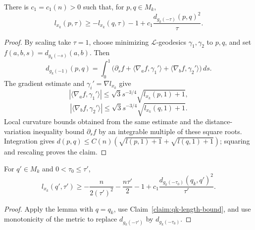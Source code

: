 \begin{lemma}\label{lem:l-function-lower-bound}
\label{lowerbdd}
There is $c_1=c_1(n)>0$ such that, for $p,q\in M_k$,
\[
 l_{x_k}(p,\tau)\geq-l_{x_k}(q,\tau)-1
 +c_1\frac{d_{g_k(-\tau)}(p,q)^2}{\tau}.
\]
\end{lemma}
\begin{proof}
\sketch By scaling take $\tau=1$, choose minimizing
$\mathcal L$-geodesics $\gamma_1,\gamma_2$ to $p,q$, and set
$f(a,b,s)=d_{g_k(-s)}(a,b)$. Then
\begin{equation}\label{fform}
 d_{g_k(-1)}(p,q)=\int_0^1
 \bigl(\partial_sf+\langle\nabla_af,\gamma_1'\rangle
 +\langle\nabla_bf,\gamma_2'\rangle\bigr)\,ds.
\end{equation}
The gradient estimate and $\gamma_i'=\nabla l_{x_k}$ give
\begin{equation}\label{1eqn}
 |\langle\nabla_af,\gamma_1'\rangle|
 \leq\sqrt3s^{-3/4}\sqrt{l_{x_k}(p,1)+1},
\end{equation}
\begin{equation}\label{2eqn}
 |\langle\nabla_bf,\gamma_2'\rangle|
 \leq\sqrt3s^{-3/4}\sqrt{l_{x_k}(q,1)+1}.
\end{equation}
Local curvature bounds obtained from the same estimate and the
distance-variation inequality bound $\partial_sf$ by an integrable
multiple of these square roots. Integration gives
$d(p,q)\leq C(n)(\sqrt{l(p,1)+1}+\sqrt{l(q,1)+1})$; squaring and
rescaling proves the claim.
\end{proof}

\begin{corollary}\label{cor:l-function-lower-bound-refined}
For $q'\in M_k$ and $0<\tau_0\leq\tau'$,
\[
 l_{x_k}(q',\tau')\geq
 -\frac{n}{2(\tau')^2}-\frac{n\tau'}2-1
 +c_1\frac{d_{g_k(-\tau_0)}(q_k,q')^2}{\tau'}.
\]
\end{corollary}
\begin{proof}
\sketch
{}
Apply the lemma with $q=q_k$, use
Claim~\ref{claim:qk-length-bound}, and use monotonicity of the metric
to replace $d_{g_k(-\tau')}$ by $d_{g_k(-\tau_0)}$.
\end{proof}

